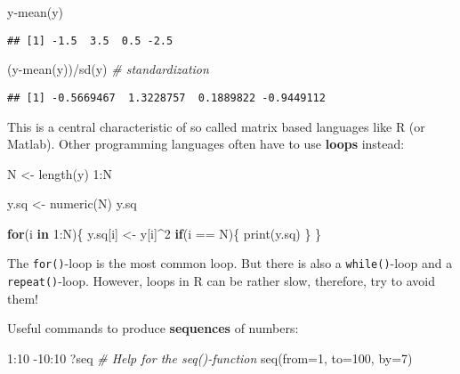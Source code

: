 \documentclass[
]{book}
\newenvironment{Shaded}{\begin{snugshade}}{\end{snugshade}}
\newcommand{\AttributeTok}[1]{\textcolor[rgb]{0.77,0.63,0.00}{#1}}
\newcommand{\CommentTok}[1]{\textcolor[rgb]{0.56,0.35,0.01}{\textit{#1}}}
\newcommand{\ControlFlowTok}[1]{\textcolor[rgb]{0.13,0.29,0.53}{\textbf{#1}}}
\newcommand{\DecValTok}[1]{\textcolor[rgb]{0.00,0.00,0.81}{#1}}
\newcommand{\FunctionTok}[1]{\textcolor[rgb]{0.00,0.00,0.00}{#1}}
\newcommand{\NormalTok}[1]{#1}
\newcommand{\OtherTok}[1]{\textcolor[rgb]{0.56,0.35,0.01}{#1}}
\newcommand{\SpecialCharTok}[1]{\textcolor[rgb]{0.00,0.00,0.00}{#1}}
\begin{document}
\begin{Shaded}
\begin{Highlighting}[]
\NormalTok{y}\SpecialCharTok{{-}}\FunctionTok{mean}\NormalTok{(y)}
\end{Highlighting}
\end{Shaded}

\begin{verbatim}
## [1] -1.5  3.5  0.5 -2.5
\end{verbatim}

\begin{Shaded}
\begin{Highlighting}[]
\NormalTok{(y}\SpecialCharTok{{-}}\FunctionTok{mean}\NormalTok{(y))}\SpecialCharTok{/}\FunctionTok{sd}\NormalTok{(y) }\CommentTok{\# standardization }
\end{Highlighting}
\end{Shaded}

\begin{verbatim}
## [1] -0.5669467  1.3228757  0.1889822 -0.9449112
\end{verbatim}

This is a central characteristic of so called matrix based languages like R (or Matlab). Other programming languages often have to use \textbf{loops} instead:

\begin{Shaded}
\begin{Highlighting}[]
\NormalTok{N }\OtherTok{\textless{}{-}} \FunctionTok{length}\NormalTok{(y)}
\DecValTok{1}\SpecialCharTok{:}\NormalTok{N}

\NormalTok{y.sq }\OtherTok{\textless{}{-}} \FunctionTok{numeric}\NormalTok{(N)}
\NormalTok{y.sq}

\ControlFlowTok{for}\NormalTok{(i }\ControlFlowTok{in} \DecValTok{1}\SpecialCharTok{:}\NormalTok{N)\{}
\NormalTok{  y.sq[i] }\OtherTok{\textless{}{-}}\NormalTok{ y[i]}\SpecialCharTok{\^{}}\DecValTok{2}
  \ControlFlowTok{if}\NormalTok{(i }\SpecialCharTok{==}\NormalTok{ N)\{}
    \FunctionTok{print}\NormalTok{(y.sq)}
\NormalTok{  \}}
\NormalTok{\}}
\end{Highlighting}
\end{Shaded}

The \texttt{for()}-loop is the most common loop. But there is also a \texttt{while()}-loop and a \texttt{repeat()}-loop. However, loops in R can be rather slow, therefore, try to avoid them!

Useful commands to produce \textbf{sequences} of numbers:

\begin{Shaded}
\begin{Highlighting}[]
\DecValTok{1}\SpecialCharTok{:}\DecValTok{10}
\SpecialCharTok{{-}}\DecValTok{10}\SpecialCharTok{:}\DecValTok{10}
\NormalTok{?seq }\CommentTok{\# Help for the seq(){-}function}
\FunctionTok{seq}\NormalTok{(}\AttributeTok{from=}\DecValTok{1}\NormalTok{, }\AttributeTok{to=}\DecValTok{100}\NormalTok{, }\AttributeTok{by=}\DecValTok{7}\NormalTok{)}
\end{Highlighting}
\end{Shaded}
\end{document}
